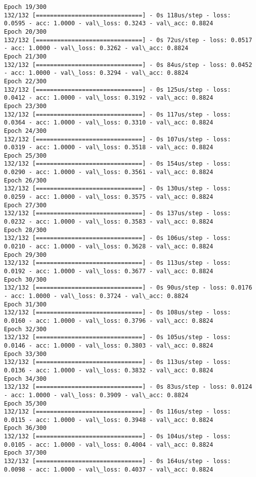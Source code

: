 \documentclass[11pt]{article}
\begin{document}
\begin{Verbatim}[commandchars=\\\{\}]
Epoch 19/300
132/132 [==============================] - 0s 118us/step - loss: 0.0595 - acc: 1.0000 - val\_loss: 0.3243 - val\_acc: 0.8824
Epoch 20/300
132/132 [==============================] - 0s 72us/step - loss: 0.0517 - acc: 1.0000 - val\_loss: 0.3262 - val\_acc: 0.8824
Epoch 21/300
132/132 [==============================] - 0s 84us/step - loss: 0.0452 - acc: 1.0000 - val\_loss: 0.3294 - val\_acc: 0.8824
Epoch 22/300
132/132 [==============================] - 0s 125us/step - loss: 0.0412 - acc: 1.0000 - val\_loss: 0.3192 - val\_acc: 0.8824
Epoch 23/300
132/132 [==============================] - 0s 117us/step - loss: 0.0364 - acc: 1.0000 - val\_loss: 0.3310 - val\_acc: 0.8824
Epoch 24/300
132/132 [==============================] - 0s 107us/step - loss: 0.0319 - acc: 1.0000 - val\_loss: 0.3518 - val\_acc: 0.8824
Epoch 25/300
132/132 [==============================] - 0s 154us/step - loss: 0.0290 - acc: 1.0000 - val\_loss: 0.3561 - val\_acc: 0.8824
Epoch 26/300
132/132 [==============================] - 0s 130us/step - loss: 0.0259 - acc: 1.0000 - val\_loss: 0.3575 - val\_acc: 0.8824
Epoch 27/300
132/132 [==============================] - 0s 137us/step - loss: 0.0232 - acc: 1.0000 - val\_loss: 0.3583 - val\_acc: 0.8824
Epoch 28/300
132/132 [==============================] - 0s 106us/step - loss: 0.0210 - acc: 1.0000 - val\_loss: 0.3628 - val\_acc: 0.8824
Epoch 29/300
132/132 [==============================] - 0s 113us/step - loss: 0.0192 - acc: 1.0000 - val\_loss: 0.3677 - val\_acc: 0.8824
Epoch 30/300
132/132 [==============================] - 0s 90us/step - loss: 0.0176 - acc: 1.0000 - val\_loss: 0.3724 - val\_acc: 0.8824
Epoch 31/300
132/132 [==============================] - 0s 108us/step - loss: 0.0160 - acc: 1.0000 - val\_loss: 0.3796 - val\_acc: 0.8824
Epoch 32/300
132/132 [==============================] - 0s 105us/step - loss: 0.0146 - acc: 1.0000 - val\_loss: 0.3803 - val\_acc: 0.8824
Epoch 33/300
132/132 [==============================] - 0s 113us/step - loss: 0.0136 - acc: 1.0000 - val\_loss: 0.3832 - val\_acc: 0.8824
Epoch 34/300
132/132 [==============================] - 0s 83us/step - loss: 0.0124 - acc: 1.0000 - val\_loss: 0.3909 - val\_acc: 0.8824
Epoch 35/300
132/132 [==============================] - 0s 116us/step - loss: 0.0115 - acc: 1.0000 - val\_loss: 0.3948 - val\_acc: 0.8824
Epoch 36/300
132/132 [==============================] - 0s 104us/step - loss: 0.0105 - acc: 1.0000 - val\_loss: 0.4004 - val\_acc: 0.8824
Epoch 37/300
132/132 [==============================] - 0s 164us/step - loss: 0.0098 - acc: 1.0000 - val\_loss: 0.4037 - val\_acc: 0.8824

\end{Verbatim}
\end{document}

